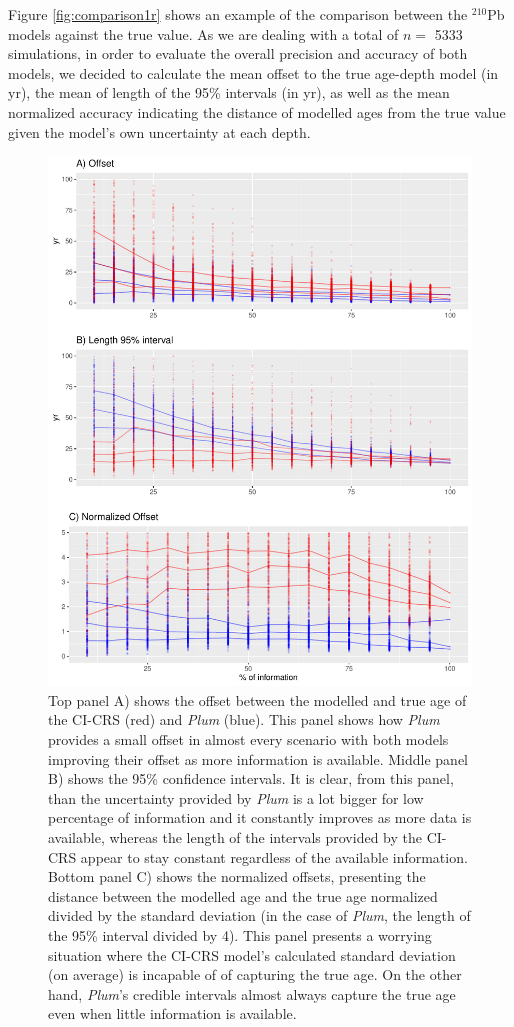 \documentclass [10pt] {article}
\begin{document}
Figure \ref{fig:comparison1r} shows an example of the comparison between the $^{210}$Pb models against the true value. 
As we are dealing with a total of $n =$ 5333 simulations, in order to evaluate the overall precision and accuracy of both models, we decided to calculate the mean offset to the true age-depth model (in yr), the mean of length of the 95\% intervals (in yr), as well as the mean normalized accuracy indicating the distance of modelled ages from the true value given the model's own uncertainty at each depth.  

\begin{figure}[!]
 \centering
  \includegraphics[width=.75\linewidth]{AccPrec.pdf}
	\caption{Top panel A) shows the offset between the modelled and true age of the CI-CRS (red) and \textit{Plum} (blue). This panel shows how \textit{Plum} provides a small offset in almost every scenario with both models improving their offset as more information is available. Middle panel B) shows the 95\% confidence intervals. It is clear, from this panel, than the uncertainty provided by \textit{Plum} is a lot bigger for low percentage of information and it constantly improves as more data is available, whereas the length of the intervals provided by the CI-CRS appear to stay constant regardless of the available information. Bottom panel C) shows the normalized offsets, presenting the distance between the modelled age and the true age normalized divided by the standard deviation (in the case of \textit{Plum}, the length of the 95\% interval divided by 4). This panel presents a worrying situation where the CI-CRS model's calculated standard deviation (on average) is incapable of of capturing the true age. On the other hand, \textit{Plum}'s credible intervals almost always capture the true age even when little information is available.}
  \label{fig:accpre}
\end{figure}
\end{document}
